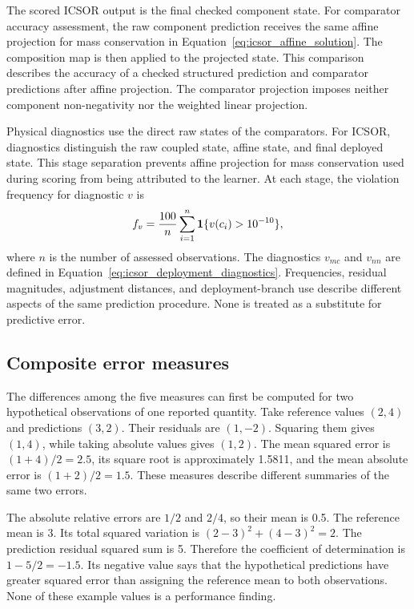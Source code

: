 The scored ICSOR output is the final checked component state. For comparator accuracy assessment, the raw component prediction receives the same affine projection for mass conservation in Equation~\eqref{eq:icsor_affine_solution}. The composition map is then applied to the projected state. This comparison describes the accuracy of a checked structured prediction and comparator predictions after affine projection. The comparator projection imposes neither component non-negativity nor the weighted linear projection.

Physical diagnostics use the direct raw states of the comparators. For ICSOR, diagnostics distinguish the raw coupled state, affine state, and final deployed state. This stage separation prevents affine projection for mass conservation used during scoring from being attributed to the learner. At each stage, the violation frequency for diagnostic \(v\) is
\begin{equation}
\equationname{Percentage frequency of a physical-constraint violation}
\label{eq:icsor_violation_frequency}
f_v=\frac{100}{n}\sum_{i=1}^{n}
\mathbf{1}\{v(c_i)>10^{-10}\},
\end{equation}
where \(n\) is the number of assessed observations. The diagnostics \(v_{mc}\) and \(v_{nn}\) are defined in Equation~\eqref{eq:icsor_deployment_diagnostics}. Frequencies, residual magnitudes, adjustment distances, and deployment-branch use describe different aspects of the same prediction procedure. None is treated as a substitute for predictive error.

\subsection{Composite error measures}

The differences among the five measures can first be computed for two hypothetical observations of one reported quantity. Take reference values \((2,4)\) and predictions \((3,2)\). Their residuals are \((1,-2)\). Squaring them gives \((1,4)\), while taking absolute values gives \((1,2)\). The mean squared error is \((1+4)/2=2.5\), its square root is approximately 1.5811, and the mean absolute error is \((1+2)/2=1.5\). These measures describe different summaries of the same two errors.

The absolute relative errors are \(1/2\) and \(2/4\), so their mean is 0.5. The reference mean is 3. Its total squared variation is \((2-3)^2+(4-3)^2=2\). The prediction residual squared sum is 5. Therefore the coefficient of determination is \(1-5/2=-1.5\). Its negative value says that the hypothetical predictions have greater squared error than assigning the reference mean to both observations. None of these example values is a performance finding.

